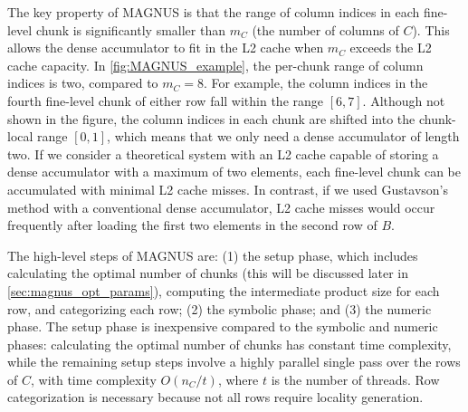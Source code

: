 The key property of MAGNUS is that the range of column indices in each fine-level chunk is significantly smaller than $m_C$ (the number of columns of $C$).
This allows the dense accumulator to fit in the L2 cache when $m_C$ exceeds the L2 cache capacity. In \autoref{fig:MAGNUS_example}, the per-chunk range of column indices is two, compared to $m_C=8$. For example, the column indices in the fourth fine-level chunk of either row fall within the range $[6,7]$.
Although not shown in the figure, the column indices in each chunk are shifted into the chunk-local range $[0,1]$, which means that we only need a dense accumulator of length two.
If we consider a theoretical system with an L2 cache capable of storing a dense accumulator with a maximum of two elements, each fine-level chunk can be accumulated with minimal L2 cache misses.
In contrast, if we used Gustavson's method with a conventional dense accumulator, L2 cache misses would occur frequently after loading the first two elements in the second row of $B$. 

The high-level steps of MAGNUS are: (1) the setup phase, which includes calculating the optimal number of chunks (this will be discussed later in \autoref{sec:magnus_opt_params}), computing the intermediate product size for each row, and categorizing each row; (2) the symbolic phase; and (3) the numeric phase.
The setup phase is inexpensive compared to the symbolic and numeric phases: calculating the optimal number of chunks has constant time complexity, 
while the remaining setup steps involve a highly parallel single pass over the rows of $C$, with time complexity $O(n_C/t)$, where $t$ is the number of threads.
Row categorization is necessary because not all rows require locality generation. 

